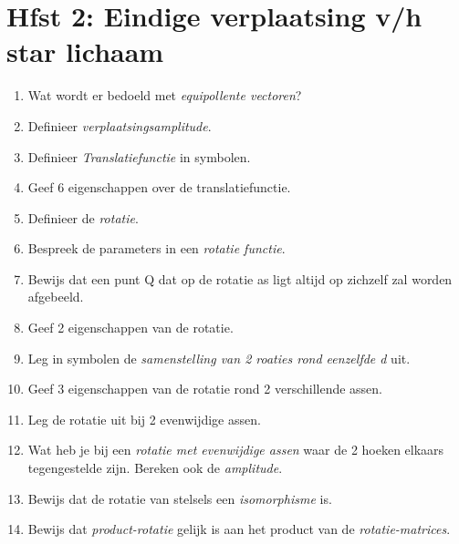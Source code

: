 \documentclass[12pt]{article}
\begin{document}
    \maketitle

    \section{Hfst 2: Eindige verplaatsing v/h star lichaam}%
	\label{sec:Hfst_2:_Eindige_verplaatsing_v/h_star_lichaam}
    
	\begin{enumerate}
		\item Wat wordt er bedoeld met \emph{equipollente vectoren}?
		\item Definieer \emph{verplaatsingsamplitude}.
		\item Definieer \emph{Translatiefunctie} in symbolen.
		\item Geef 6 eigenschappen over de translatiefunctie.
		\item Definieer de \emph{rotatie}.
		\item Bespreek de parameters in een \emph{rotatie functie}.
		\item Bewijs dat een punt Q dat op de rotatie as ligt altijd op zichzelf zal worden afgebeeld.
		\item Geef 2 eigenschappen van de rotatie.
		\item Leg in symbolen de \emph{samenstelling van 2 roaties rond eenzelfde d} uit.
		\item Geef 3 eigenschappen van de rotatie rond 2 verschillende assen.
		\item Leg de rotatie uit bij 2 evenwijdige assen.
		\item Wat heb je bij een \emph{rotatie met evenwijdige assen} waar de 2 hoeken elkaars tegengestelde zijn. Bereken ook de \emph{amplitude}.
		\item Bewijs dat de rotatie van stelsels een \emph{isomorphisme} is.
		\item Bewijs dat \emph{product-rotatie} gelijk is aan het product van de \emph{rotatie-matrices}.
	\end{enumerate}
\end{document}
